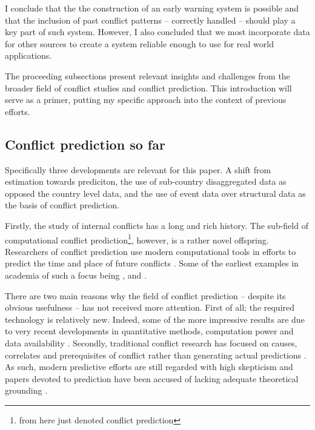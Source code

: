 \documentclass[a4paper]{article}
\begin{document}
I conclude that the the construction of an early warning system is possible and that the inclusion of past conflict patterns -- correctly handled -- should play a key part of such system. However, I also concluded that we most incorporate data for other sources to create a system reliable enough to use for real world applications.\par 

The proceeding subsections present relevant insights and challenges from the broader field of conflict studies and conflict prediction. This introduction will serve as a primer, putting my specific approach into the context of previous efforts.\par


\subsection{Conflict prediction so far}

Specifically three developments are relevant for this paper. A shift from estimation towards prediciton, the use of sub-country disaggregated data as opposed the country level data, and the use of event data over structural data as the basis of conflict prediction.\par

Firstly, the study of internal conflicts has a long and rich history. The sub-field of computational conflict prediction\footnote{from here just denoted conflict prediction}, however, is a rather novel offspring. Researchers of conflict prediction use modern computational tools in efforts to predict the time and place of future conflicts \citep{cederman2017predicting, chadefaux2017conflict}. Some of the earliest examples in academia of such a focus being \cite{Goldstone_2010}, \cite{Hegre2013} and \cite{perry_2013}.\par

There are two main reasons why the field of conflict prediction -- despite its obvious usefulness -- has not received more attention. First of all; the required technology is relatively new. Indeed, some of the more impressive results are due to very recent developments in quantitative methods, computation power and data availability \citep{ol2010afghanistan, perry_2013}. Secondly, traditional conflict research has focused on causes, correlates and prerequisites of conflict rather than generating actual predictions \citep[8]{chadefaux2017conflict}. As such, modern predictive efforts are still regarded with high skepticism and papers devoted to prediction have been accused of lacking adequate theoretical grounding \citep[8-9]{chadefaux2017conflict}. 
\end{document}
